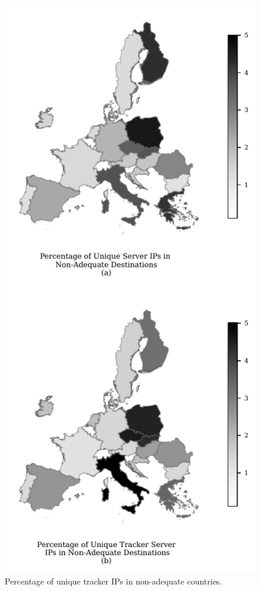 \begin{center}
\begin{figure}
    \centering
    \includegraphics[width=0.8\linewidth]{figures/greece-uniquetrackeripandserver.pdf}
    \caption{Percentage of unique tracker IPs in non-adequate countries.}
\label{fig:euheat}
\vspace{-6mm}
\end{figure}
\end{center}


